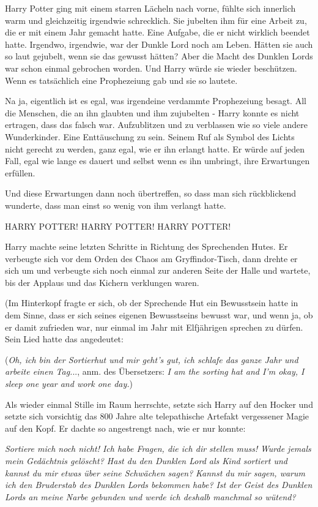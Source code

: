 Harry Potter ging mit einem starren Lächeln nach vorne, fühlte sich innerlich
warm und gleichzeitig irgendwie schrecklich. Sie jubelten ihm für eine Arbeit
zu, die er mit einem Jahr gemacht hatte. Eine Aufgabe, die er nicht wirklich
beendet hatte. Irgendwo, irgendwie, war der Dunkle Lord noch am Leben. Hätten
sie auch so laut gejubelt, wenn sie das gewusst hätten? Aber die Macht des
Dunklen Lords war schon einmal gebrochen worden. Und Harry würde sie wieder
beschützen. Wenn es tatsächlich eine Prophezeiung gab und sie so lautete.

Na ja, eigentlich ist es egal, was irgendeine verdammte Prophezeiung besagt. All
die Menschen, die an ihn glaubten und ihm zujubelten - Harry konnte es nicht
ertragen, dass das falsch war. Aufzublitzen und zu verblassen wie so viele
andere Wunderkinder. Eine Enttäuschung zu sein. Seinem Ruf als Symbol des Lichts
nicht gerecht zu werden, ganz egal, wie er ihn erlangt hatte. Er würde auf jeden
Fall, egal wie lange es dauert und selbst wenn es ihn umbringt, ihre Erwartungen
erfüllen.

Und diese Erwartungen dann noch übertreffen, so dass man sich rückblickend
wunderte, dass man einst so wenig von ihm verlangt hatte.

\glqq{}HARRY POTTER! HARRY POTTER! HARRY POTTER!\grqq{}

Harry machte seine letzten Schritte in Richtung des Sprechenden Hutes. Er
verbeugte sich vor dem Orden des Chaos am Gryffindor-Tisch, dann drehte er sich
um und verbeugte sich noch einmal zur anderen Seite der Halle und wartete, bis
der Applaus und das Kichern verklungen waren.

(Im Hinterkopf fragte er sich, ob der Sprechende Hut ein Bewusstsein hatte in
dem Sinne, dass er sich seines eigenen Bewusstseins bewusst war, und wenn ja, ob
er damit zufrieden war, nur einmal im Jahr mit Elfjährigen sprechen zu dürfen.
Sein Lied hatte das angedeutet:

(\emph{Oh, ich bin der Sortierhut und mir geht's gut, ich schlafe das ganze Jahr
und arbeite einen Tag.}.., anm. des Übersetzers: \emph{\glqq{}I am the sorting
hat and I'm okay, I sleep one year and work one day.\grqq{}})

Als wieder einmal Stille im Raum herrschte, setzte sich Harry auf den Hocker und
setzte sich vorsichtig das 800 Jahre alte telepathische Artefakt vergessener
Magie auf den Kopf. Er dachte so angestrengt nach, wie er nur konnte:

\emph{Sortiere mich noch nicht! Ich habe Fragen, die ich dir stellen muss!}
\emph{Wurde jemals mein Gedächtnis gelöscht? Hast du den Dunklen Lord als Kind
sortiert und kannst du mir etwas über seine Schwächen sagen?} \emph{Kannst du
mir sagen, warum ich den Bruderstab des Dunklen Lords bekommen habe?} \emph{Ist
der Geist des Dunklen Lords an meine Narbe gebunden und werde ich deshalb
manchmal so wütend?}

